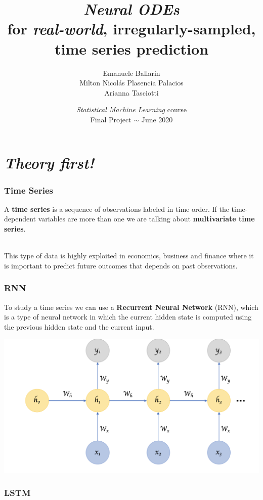 \documentclass{beamer}
\title[\textit{Neural ODEs} for \textit{real-world}, irregularly-sampled, time series prediction]{\textit{Neural ODEs} \\ for \textit{real-world}, irregularly-sampled, time series prediction}
\author[E. Ballarin, M. N. Plasencia Palacios, A. Tasciotti]{Emanuele Ballarin \\ Milton Nicolás Plasencia Palacios \\ Arianna Tasciotti}
\institute[]{Department of Mathematics and Geosciences, University of Trieste}
\date[]{\textit{Statistical Machine Learning} course \\ Final Project $\sim$ June 2020}
\begin{document}
\frame{\titlepage}


\section{\textit{Theory first!}}{

\begin{frame}
\frametitle{Time Series}

A \textbf{time series} is a sequence of observations labeled in time order.  If the time-dependent variables are more than one we are talking about \textbf{multivariate time series}.\\~\

This type of data is highly exploited in economics, business and finance where it is important to predict future outcomes that depends on past observations.

\end{frame}
\begin{frame}
	\frametitle{RNN}
	To study a time series we can use a \textbf{Recurrent Neural Network} (RNN), which is a type of neural network in which the current hidden state is computed using the previous hidden state and the current input.

	 \includegraphics[scale = 0.25]{rnn1.png}
\end{frame}
\begin{frame}
\frametitle{LSTM}


\end{frame}}
\end{document}
